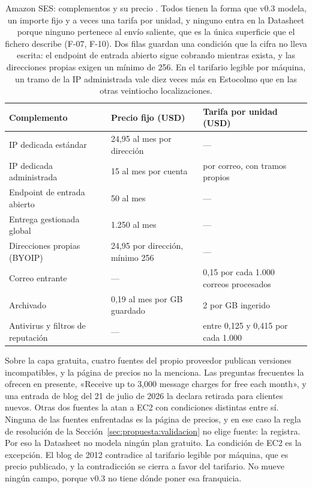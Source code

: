 \begin{table}[H]
\centering
\scriptsize
\setlength{\tabcolsep}{3pt}
\renewcommand{\arraystretch}{1.15}
\begin{tabular}{|p{}|p{}|p{}|}
\hline
\textbf{Complemento} & \textbf{Precio fijo (USD)} & \textbf{Tarifa por unidad (USD)} \\
\hline
IP dedicada estándar & 24,95 al mes por dirección & --- \\
\hline
IP dedicada administrada & 15 al mes por cuenta & por correo, con tramos propios \\
\hline
Endpoint de entrada abierto & 50 al mes & --- \\
\hline
Entrega gestionada global & 1.250 al mes & --- \\
\hline
Direcciones propias (BYOIP) & 24,95 por dirección, mínimo 256 & --- \\
\hline
Correo entrante & --- & 0,15 por cada 1.000 correos procesados \\
\hline
Archivado & 0,19 al mes por GB guardado & 2 por GB ingerido \\
\hline
Antivirus y filtros de reputación & --- & entre 0,125 y 0,415 por cada 1.000 \\
\hline
\end{tabular}
\caption{Amazon SES: complementos y su precio \citep{sespricing}. Todos tienen la forma
que v0.3 modela, un importe fijo y a veces una tarifa por unidad, y ninguno entra en la
Datasheet porque ninguno pertenece al envío saliente, que es la única superficie que el
fichero describe (F-07, F-10). Dos filas guardan una condición que la cifra no lleva
escrita: el endpoint de entrada abierto sigue cobrando mientras exista, y las direcciones
propias exigen un mínimo de 256. En el tarifario legible por máquina, un tramo de
la IP administrada vale diez veces más en Estocolmo que en las otras veintiocho
localizaciones.}
\label{tab:hallazgos:ses:complementos}
\end{table}

Sobre la capa gratuita, cuatro fuentes del propio proveedor publican versiones
incompatibles, y la página de precios no la menciona. Las preguntas frecuentes
la ofrecen en presente, «Receive up to 3,000 message charges for free each
month», y una entrada de blog del 21 de julio de 2026 la declara retirada para
clientes nuevos. Otras dos fuentes la atan a EC2 con condiciones distintas
entre sí. Ninguna de las fuentes enfrentadas es la página de precios, y en ese
caso la regla de resolución de la Sección~\ref{sec:propuesta:validacion} no
elige fuente: la registra. Por eso la Datasheet no modela ningún plan gratuito.
La condición de EC2 es la excepción. El blog de 2012 contradice al tarifario
legible por máquina, que es precio publicado, y la contradicción se cierra a
favor del tarifario.
No mueve ningún campo, porque v0.3 no tiene dónde poner esa franquicia.

